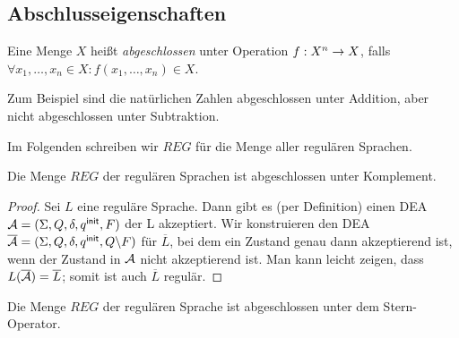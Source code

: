 \subsection{Abschlusseigenschaften}

\begin{Def}[name={[Abgeschlossenheit von $\mathcal{L}$]}]
        Eine Menge $X$ heißt \emph{abgeschlossen} unter Operation $f:X^n \-> X$, falls $\forall x_1,\dots, x_n\in X : f(x_1,\dots, x_n)\in X$.
\end{Def}
Zum Beispiel sind die natürlichen Zahlen abgeschlossen unter Addition, aber nicht abgeschlossen unter Subtraktion.

Im Folgenden schreiben wir $REG$ für die Menge aller regulären Sprachen.

\begin{lemma}\label{satz:2.ClosedComplement}
 Die Menge $REG$ der regulären Sprachen ist abgeschlossen unter Komplement.
\end{lemma}

\begin{proof}
Sei $L$ eine reguläre Sprache. 
Dann gibt es (per Definition) einen DEA $\mathcal{A}=(\Sigma, Q, \delta, q^\mathsf{init}, F)$ der L akzeptiert.
Wir konstruieren den DEA $\overline{\mathcal{A}}=(\Sigma, Q, \delta, q^\mathsf{init}, Q\backslash F)$ für $\overline{L}$, bei dem ein Zustand genau dann akzeptierend ist, wenn der Zustand in $\mathcal{A}$ nicht akzeptierend ist.
Man kann leicht zeigen, dass $L(\overline{\mathcal{A}})=\overline{L}$; somit ist auch $\overline{L}$ regulär.
\end{proof}

\begin{lemma}\label{satz:2.ClosedStar}
Die Menge $REG$ der regulären Sprache ist abgeschlossen unter dem Stern-Operator.
\end{lemma}

